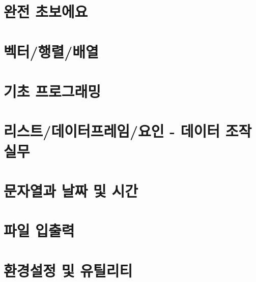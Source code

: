 %
%
%
%
%
%



\chapter{완전 초보에요}


\chapter{벡터/행렬/배열}


\chapter{기초 프로그래밍}


\chapter{리스트/데이터프레임/요인 - 데이터 조작실무}


\chapter{문자열과 날짜 및 시간}


\chapter{파일 입출력}


\chapter{환경설정 및 유틸리티}

